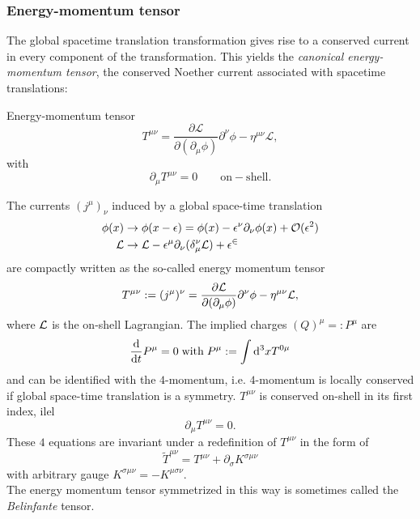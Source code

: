 \subsubsection{Energy-momentum tensor}
The global spacetime translation transformation gives rise to a conserved current in every component of the transformation. This yields the \emph{canonical energy-momentum tensor}, the conserved Noether current associated with spacetime translations:
\begin{mybox}{Energy-momentum tensor}
	\begin{equation}
	T^{\mu \nu} = \frac{\partial \mathcal{L}}{\partial (\partial_{\mu} \phi)} \partial^{\nu} \phi - \eta^{\mu \nu} \mathcal{L},
	\end{equation}
	with
	\begin{equation}
	\partial_{\mu} T^{\mu \nu} = 0 \qquad \mathrm{on-shell}.
	\end{equation}
\end{mybox}
\begin{mybox}{}
	The currents $(j^\mu)_\nu$ induced by a global space-time translation
	\begin{align}
		\phi(x) & \rightarrow \phi(x-\epsilon) = \phi(x) - \epsilon^\nu \partial_\nu \phi(x) + \mathcal{O}(\epsilon^2)\\
		\mathcal{L} & \rightarrow \mathcal{L} -\epsilon^\mu \partial_\nu (\delta^\nu_\mu \mathcal{L}) + \mathcal{\epsilon^2}
	\end{align}
	are compactly written as the so-called energy momentum tensor
	\begin{equation}
	\label{eq:QFTcanonicalenergytensor}
		T^{\mu\nu} := (j^\mu)^\nu = \frac{\partial \mathcal{L}}{\partial(\partial_\mu \phi)} \partial^\nu \phi - \eta^{\mu\nu} \mathcal{L},
	\end{equation}
	where $\mathcal{L}$ is the on-shell Lagrangian. The implied charges $(Q)^\mu =: P^\mu$ are
	\begin{equation}
	\label{eq:fourmomentumNoether}
		\frac{\mathrm{d}}{\mathrm{d} t} P^\mu = 0 \; \mathrm{with} \; P^\mu := \int \mathrm{d}^3 x T^{0 \mu}
	\end{equation}
	and can be identified with the $4$-momentum, i.e. $4$-momentum is locally conserved if global space-time translation is a symmetry. $T^{\mu\nu}$ is conserved on-shell in its first index, ilel 
	\begin{equation}
		\partial_\mu T^{\mu \nu} = 0.
	\end{equation}
	These $4$ equations are invariant under a redefinition of $T^{\mu\nu}$ in the form of 
	\begin{equation}
	\label{eq:BelinfanteEnergytensor}
		\tilde{T}^{\mu\nu} = T^{\mu\nu} + \partial_\sigma K^{\sigma \mu \nu}
	\end{equation}
	with arbitrary gauge $K^{\sigma \mu \nu} = - K^{\mu \sigma \nu}$.\\
	The energy momentum tensor symmetrized in this way is sometimes called the \emph{Belinfante} tensor.
\end{mybox}
